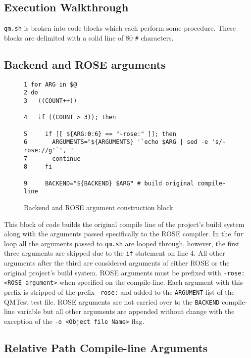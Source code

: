 \subsection{Execution Walkthrough}
{\tt qm.sh} is broken into code blocks which each perform some procedure. These
blocks are delimited with a solid line of 80 {\tt \#} characters.

\subsection{Backend and ROSE arguments}

\begin{figure}[!ht]
{\scriptsize
\begin{verbatim}
1 for ARG in $@
2 do
3   ((COUNT++))
                                                                                
4   if ((COUNT > 3)); then
                                                                                
5     if [[ ${ARG:0:6} == "-rose:" ]]; then
6       ARGUMENTS="${ARGUMENTS} '`echo $ARG | sed -e 's/-rose://g'`', "
7       continue
8     fi
                                                                                
9     BACKEND="${BACKEND} $ARG" # build original compile-line
\end{verbatim}
}
\caption{Backend and ROSE argument construction block}
\end{figure}

This block of code builds the original compile line of the project's build
system along with the arguments passed specifically to the ROSE compiler. In
the {\tt for} loop all the arguments passed to {\tt qm.sh} are looped through,
however, the first three arguments are skipped due to the {\tt if} statement on
line 4. All other arguments after the third are considered arguments of either
ROSE or the original project's build system. ROSE arguments must be prefixed
with {\tt -rose:<ROSE argument>} when specified on the compile-line. Each
argument with this prefix is stripped of the prefix {\tt -rose:} and added to
the {\tt ARGUMENT} list of the QMTest test file. ROSE arguments are not
carried over to the {\tt BACKEND} compile-line variable but all other arguments
are appended without change with the exception of the 
{\tt -o <Object file Name>} flag.

\subsection{Relative Path Compile-line Arguments}

